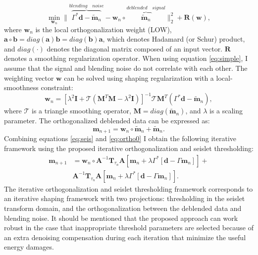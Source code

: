\begin{equation}
\label{eq:simple}
\min_{\mathbf{w}_n} \parallel \overbrace{\Gamma^*\mathbf{d} - \tilde{\mathbf{m}}_n}^{blending\quad noise} - \mathbf{w}_n\circ \overbrace{\tilde{\mathbf{m}}_n}^{deblended\quad signal} \parallel_2^2 + \mathbf{R}(\mathbf{w}),
\end{equation}
where $\mathbf{w}_n$ is the local orthogonalization weight (LOW), $\mathbf{a}\circ\mathbf{b}=diag(\mathbf{a})\mathbf{b}=diag(\mathbf{b})\mathbf{a}$, which denotes Hadamard (or Schur) product, and $diag(\cdot)$ denotes the diagonal matrix composed of an input vector. $\mathbf{R}$ denotes a smoothing regularization operator. When using equation \ref{eq:simple}, I assume that the signal and blending noise do not correlate with each other. The weighting vector $\mathbf{w}$ can be solved using shaping regularization \cite{fomel2007shape} with a local-smoothness constraint:
\begin{equation}
\label{eq:shape}
\mathbf{w}_n = [\lambda^2\mathbf{I} + \mathcal{T}(\mathbf{M}^T\mathbf{M}-\lambda^2\mathbf{I})]^{-1}\mathcal{T}\mathbf{M}^T(\Gamma^*\mathbf{d}-\tilde{\mathbf{m}}_n),
\end{equation}
where $\mathcal{T}$ is a triangle smoothing operator, $\mathbf{M}=diag(\tilde{\mathbf{m}}_n)$, and $\lambda$ is a scaling parameter. The orthogonalized deblended data can be expressed as:
\begin{equation}
\label{eq:ortho0}
\mathbf{m}_{n+1}=\mathbf{w}_n \circ \tilde{\mathbf{m}}_n + \tilde{\mathbf{m}}_n.
\end{equation}
Combining equations \ref{eq:seis} and \ref{eq:ortho0} I obtain the following iterative framework using the proposed iterative orthogonalization and seislet thresholding:
\begin{equation}
\label{eq:ortho}
\begin{split}
\mathbf{m}_{n+1}&=\mathbf{w}_n \circ \mathbf{A}^{-1}\mathbf{T}_{\tau_n}\mathbf{A}[\mathbf{m}_n+\lambda\Gamma^*[\mathbf{d}-\Gamma\mathbf{m}_n]]+\\
&\mathbf{A}^{-1}\mathbf{T}_{\tau_n}\mathbf{A}[\mathbf{m}_n+\lambda\Gamma^*[\mathbf{d}-\Gamma\mathbf{m}_n]].
\end{split}
\end{equation}
The iterative orthogonalization and seislet thresholding framework corresponds to an iterative shaping framework with two projections: thresholding in the seislet transform domain, and the orthogonalization between the deblended data and blending noise. It should be mentioned that the proposed approach can work robust in the case that inappropriate threshold parameters are selected because of an extra denoising compensation during each iteration that minimize the useful energy damages. 

